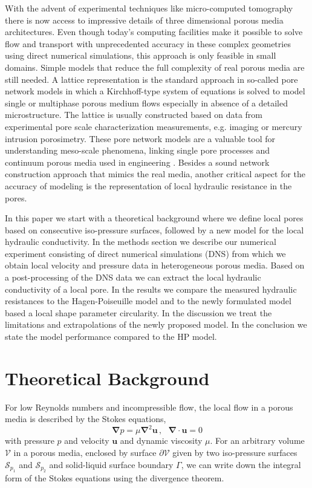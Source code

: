 \documentclass[draft]{agujournal2019}
\providecommand{\DIFdelbegin}{} %
\begin{document}
With the advent of experimental techniques like micro-computed tomography there is now access to impressive details of three dimensional porous media architectures. Even though today's computing facilities make it possible to solve flow and transport with unprecedented accuracy in these complex geometries using direct numerical simulations, this approach is only feasible in small domains. Simple models that reduce the full complexity of real porous media are still needed. A lattice representation is the standard approach in so-called pore network models in which a Kirchhoff-type system of equations is solved to model single or multiphase porous medium flows \cite{thompson_modeling_1997} especially in absence of a detailed microstructure. The lattice is usually constructed based on data from experimental pore scale characterization measurements, e.g. imaging or mercury intrusion porosimetry. These pore network models are a valuable tool for understanding meso-scale phenomena, linking single pore processes and continuum porous media used in engineering \cite{xiong_review_2016}. Besides a sound network construction approach that mimics the real media, another critical aspect for the accuracy of modeling is the representation of local hydraulic resistance in the pores. 


In this paper we start with a theoretical background where we define local pores based on consecutive iso-pressure surfaces, followed by a new model for the local hydraulic conductivity. In the methods section we describe our numerical experiment consisting of direct numerical simulations (DNS) from which we obtain local velocity and pressure data in heterogeneous porous media. Based on a post-processing of the DNS data we can extract the local hydraulic conductivity of a local pore. In the results we compare the measured hydraulic resistances to the Hagen-Poiseuille model and to the newly formulated model based a local shape parameter circularity. In the discussion we treat the limitations and extrapolations of the newly proposed model. In the conclusion we state the model performance compared to the HP model.



\section{Theoretical Background}

For low Reynolds numbers and incompressible flow, the local flow in a porous media is described by the Stokes equations,
\begin{equation}
	\mathbf{\nabla} p =  \mu\mathbf{\nabla}^2 \mathbf{u}\,,~~~\mathbf{\nabla}\cdot\mathbf{u}=0\label{eq:stokes_local}
	\end{equation}
with pressure $p$ and velocity $\mathbf{u}$ and dynamic viscosity $\mu$. For an arbitrary volume $\mathcal{V}$ in a porous media, enclosed by surface $\partial \mathcal{V}$ given by two iso-pressure surfaces $\mathcal{S}_{p_1}$ and $\mathcal{S}_{p_2}$ and solid-liquid surface boundary $\Gamma$, we can write down the integral form of the Stokes equations using the divergence theorem. 
\DIFdelbegin %
\end{document}
